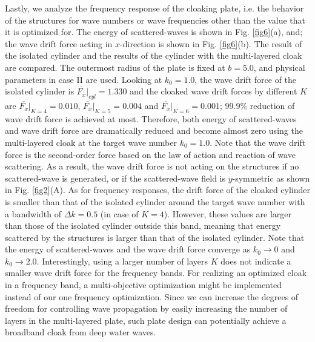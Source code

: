 \documentclass{jfm}
\begin{document}
Lastly, we analyze the frequency response of the cloaking plate, i.e. the behavior of the structures for wave numbers or wave frequencies other than the value that it is optimized for.
The energy of scattered-waves is shown in Fig. \ref{fig6}(a), and; the wave drift force acting in $x$-direction is shown in Fig. \ref{fig6}(b). The result of the isolated cylinder and the results of the cylinder with the multi-layered cloak are compared. The outermost radius of the plate is fixed at $b=5.0$, and physical parameters in case II are used. 
Looking at $k_0=1.0$, the wave drift force of the isolated cylinder is $\overline{F_x}|_{cyl}=1.330$ and the cloaked wave drift forces by different $K$ are $\overline{F_x}|_{K=4}=0.010$, $\overline{F_x}|_{K=5}=0.004$ and $\overline{F_x}|_{K=6}=0.001$; 99.9\% reduction of wave drift force is achieved at most.
Therefore, both energy of scattered-waves and wave drift force are dramatically reduced and become almost zero using the multi-layered cloak at the target wave number $k_0=1.0$. Note that the wave drift force is the second-order force based on the law of action and reaction of wave scattering. As a result, the wave drift force is not acting on the structures if no scattered-wave is generated, or if the scattered-wave field is $y$-symmetric as shown in Fig. \ref{fig2}(A).  As for frequency responses, the drift force of the cloaked cylinder is smaller than that of the isolated cylinder around the target wave number with a bandwidth of $\Delta k=0.5$ (in case of $K=4$). However, these values are larger than those of the isolated cylinder outside this band, meaning that energy scattered by the structures is larger than that of the isolated cylinder.
Note that the energy of scattered-waves and the wave drift force converge as  $k_0\to 0$ and $k_0\to 2.0$. Interestingly, using a larger number of layers $K$ does not indicate a smaller wave drift force for the frequency bands. For realizing an optimized cloak in a frequency band, a multi-objective optimization might be implemented instead of our one frequency optimization. Since we can increase the degrees of freedom for controlling wave propagation by easily increasing the number of layers in the multi-layered plate, such plate design can potentially achieve a broadband cloak from deep water waves.


\end{document}
